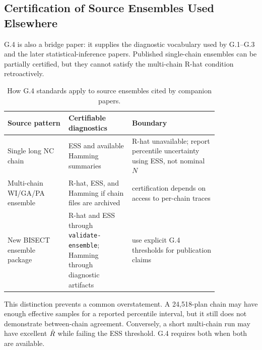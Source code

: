 \subsection{Certification of Source Ensembles Used Elsewhere}

G.4 is also a bridge paper: it supplies the diagnostic vocabulary used by
G.1--G.3 and the later statistical-inference papers. Published single-chain
ensembles can be partially certified, but they cannot satisfy the multi-chain
R-hat condition retroactively.

\begin{table}[h]
\centering
\caption{How G.4 standards apply to source ensembles cited by companion papers.}
\label{tab:source-ensemble-cert}
\begin{tabular}{p{0.24\linewidth}p{0.25\linewidth}p{0.34\linewidth}}
\toprule
Source pattern & Certifiable diagnostics & Boundary \\
\midrule
Single long NC chain & ESS and available Hamming summaries & R-hat unavailable;
report percentile uncertainty using ESS, not nominal $N$ \\
Multi-chain WI/GA/PA ensemble & R-hat, ESS, and Hamming if chain files are
archived & certification depends on access to per-chain traces \\
New BISECT ensemble package & R-hat and ESS through
\texttt{validate-ensemble}; Hamming through diagnostic artifacts & use explicit
G.4 thresholds for publication claims \\
\bottomrule
\end{tabular}
\end{table}

This distinction prevents a common overstatement. A 24{,}518-plan chain may
have enough effective samples for a reported percentile interval, but it still
does not demonstrate between-chain agreement. Conversely, a short multi-chain
run may have excellent $\hat{R}$ while failing the ESS threshold. G.4 requires
both when both are available.
